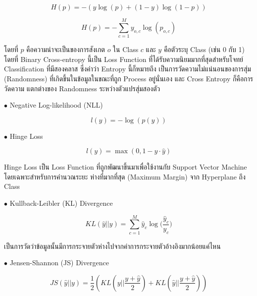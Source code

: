 \begin{equation}\label{eq:binary_entro}
    H(p) = -{(y\log(p) + (1 - y)\log(1 - p))}
\end{equation}

\begin{equation}\label{eq:multiclass_entro}
    H(p) = -\sum_{c=1}^My_{o,c}\log(p_{o,c})
\end{equation}

\noindent โดยที่ $p$ คือความน่าจะเป็นของการสังเกต $o$ ใน Class $c$ และ $y$ คือตัวระบุ Class (เช่น 0 กับ 1) โดยที่ Binary 
Cross-entropy นี้เป็น Loss Function ที่ได้รับความนิยมมากที่สุดสำหรับโจทย์ Classification ที่มีสองคลาส ซึ่งคำว่า Entropy นี้ก็หมายถึง%
เป็นการวัดความไม่แน่นอนของการสุ่ม (Randomness) ที่เกิดขึ้นในข้อมูลในขณะที่ถูก Process อยู่นั่นเอง และ Cross Entropy ก็คือการวัดความ%
แตกต่างของ Randomness ระหว่างตัวแปรสุ่มสองตัว

\noindent $\bullet$ Negative Log-likelihood (NLL)

\begin{equation}\label{eq:neg_log_like}
    l(y) = -{\log(p(y))}
\end{equation}

\noindent $\bullet$ Hinge Loss

\begin{equation}\label{eq:hinge_loss}
    l(y) = \max(0, 1 - y \cdot \hat{y})
\end{equation}

\noindent Hinge Loss เป็น Loss Function ที่ถูกพัฒนาขึ้นมาเพื่อใช้งานกับ Support Vector Machine โดยเฉพาะสำหรับการคำนวณระยะ%
ห่างที่มากที่สุด (Maximum Margin) จาก Hyperplane ถึง Class

\noindent $\bullet$ Kullback-Leibler (KL) Divergence

\begin{equation}\label{eq:kl_diver}
    KL(\hat{y} || y) = \sum_{c=1}^{M}\hat{y}_c \log \bigg( {\frac{\hat{y}_c}{y_c}} \bigg)
\end{equation}

\noindent เป็นการวัดว่าข้อมูลนั้นมีการกระจายตัวห่างไปจากค่าการกระจายตัวอ้างอิงมากน้อยแค่ไหน

\noindent $\bullet$ Jensen-Shannon (JS) Divergence

\begin{equation}\label{jensen_shannon_diver}
    JS(\hat{y} || y) = \frac{1}{2} \left ( KL \left ( y||\frac{y+\hat{y}}{2} \right ) + 
    KL \left ( \hat{y}||\frac{y+\hat{y}}{2} \right ) \right )
\end{equation}

